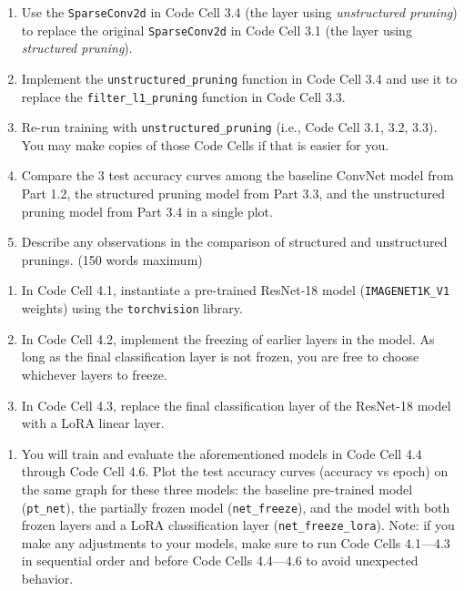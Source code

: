 \documentclass[a4 paper]{article}
\newcommand{\pya}[1]{\texttt{#1}}
\begin{document}
\solution{}


\begin{enumerate}
    \item Use the \pya{SparseConv2d} in Code Cell 3.4 (the layer using \textit{unstructured pruning}) to replace the original \pya{SparseConv2d} in Code Cell 3.1 (the layer using \textit{structured pruning}). 
    \item Implement the \pya{unstructured_pruning} function in Code Cell 3.4 and use it to replace the \pya{filter_l1_pruning} function in Code Cell 3.3.
    \item Re-run training with \pya{unstructured_pruning} (i.e., Code Cell 3.1, 3.2, 3.3). You may make copies of those Code Cells if that is easier for you.
    \item Compare the 3 test accuracy curves among the baseline ConvNet model from Part 1.2, the structured pruning model from Part 3.3, and the unstructured pruning model from Part 3.4 in a single plot.
    \item Describe any observations in the comparison of structured and unstructured prunings. (150 words maximum)
\end{enumerate}

\solution{}


\newpage
{}
\begin{enumerate}
    \item In Code Cell 4.1, instantiate a pre-trained ResNet-18 model (\pya{IMAGENET1K_V1} weights) using the \pya{torchvision} library.
    \item In Code Cell 4.2, implement the freezing of earlier layers in the model. As long as the final classification layer is not frozen, you are free to choose whichever layers to freeze.
    \item In Code Cell 4.3, replace the final classification layer of the ResNet-18 model with a LoRA linear layer.
\end{enumerate}

\solution{}


\begin{enumerate}
\item You will train and evaluate the aforementioned models in Code Cell 4.4 through Code Cell 4.6. Plot the test accuracy curves (accuracy vs epoch) on the same graph for these three models: the baseline pre-trained model (\pya{pt_net}), the partially frozen model (\pya{net_freeze}), and the model with both frozen layers and a LoRA classification layer (\pya{net_freeze_lora}).
Note: if you make any adjustments to your models, make sure to run Code Cells 4.1---4.3 in sequential order and before Code Cells 4.4---4.6 to avoid unexpected behavior.
\end{enumerate}
\end{document}
